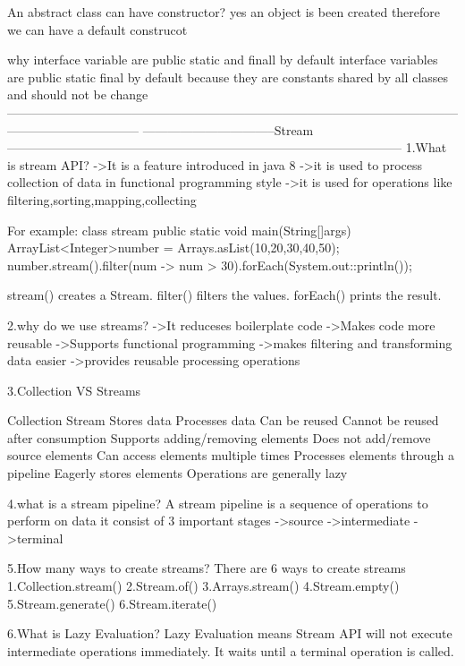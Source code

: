{{{{{{{{An abstract class can have constructor?
yes an object is been created therefore we can have a default construcot

why interface variable are public static and finall by default
interface variables are public static final by default because they are constants shared by all classes and should not be change
--------------------------------------------------------------------------------------------------------------------------------------------
--------------------------------Stream-----------------------------------------------------------------------------------------------
1.What is stream API?
->It is a feature introduced in java 8
->it is used to process collection of data in functional programming style
->it is used for operations like filtering,sorting,mapping,collecting


For example:
class stream{
public static void main(String[]args){
ArrayList<Integer>number = Arrays.asList(10,20,30,40,50);
number.stream().filter(num -> num > 30).forEach(System.out::println());
}
}


stream() creates a Stream.
filter() filters the values.
forEach() prints the result.


2.why do we use streams?
->It reduceses boilerplate code
->Makes code more reusable
->Supports functional programming
->makes filtering and transforming data easier
->provides reusable processing operations


3.Collection VS Streams


Collection	                                 Stream
Stores data	                                 Processes data
Can be reused	                             Cannot be reused after consumption
Supports adding/removing elements	         Does not add/remove source elements
Can access elements multiple times           Processes elements through a pipeline
Eagerly stores elements	                     Operations are generally lazy




4.what is a stream pipeline?
A stream pipeline is a sequence of operations to perform on data
it consist of 3 important stages
->source 
->intermediate
->terminal


5.How many ways to create streams?
There are 6 ways to create streams
1.Collection.stream()
2.Stream.of()
3.Arrays.stream()
4.Stream.empty()
5.Stream.generate()
6.Stream.iterate()




6.What is Lazy Evaluation?
Lazy Evaluation means Stream API will not execute intermediate operations immediately. It waits until a terminal operation is called.


}}}}}}}}
